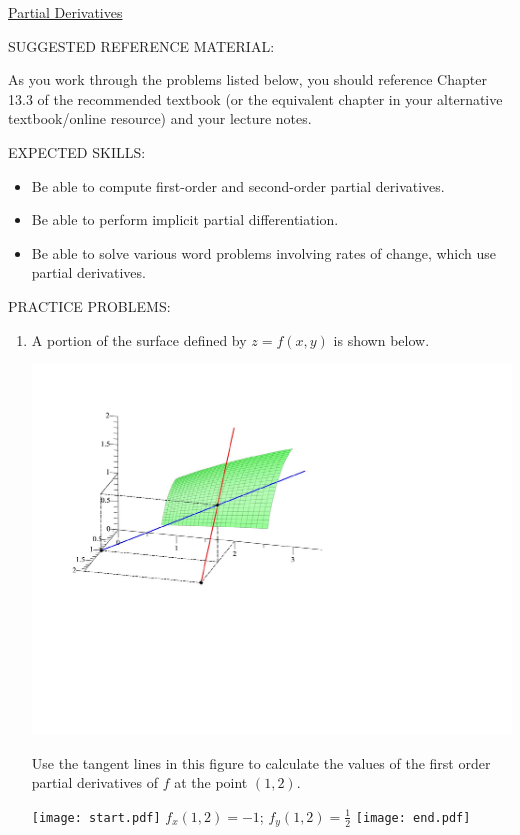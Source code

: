 \documentclass[12pt]{article}
\begin{document}
\begin{center}
\underline{\LARGE{Partial Derivatives}}
\end{center}

\noindent SUGGESTED REFERENCE MATERIAL:

\bigskip

\noindent As you work through the problems listed below, you should reference Chapter 13.3 of the recommended textbook (or the equivalent chapter in your alternative textbook/online resource) and your lecture notes.

\bigskip

\noindent EXPECTED SKILLS:

\begin{itemize}

\item Be able to compute first-order and second-order partial derivatives. 

\item Be able to perform implicit partial differentiation. 

\item Be able to solve various word problems involving rates of change, which use partial derivatives.

\end{itemize}

\noindent PRACTICE PROBLEMS:

\medskip

\begin{enumerate}

\item A portion of the surface defined by $z=f(x,y)$ is shown below.

\begin{center}
\includegraphics[scale=0.6]{tangents2.pdf}
\end{center}

Use the tangent lines in this figure to calculate the values of the first order partial derivatives of $f$ at the point $(1,2)$.

\texttt{[image: start.pdf]}
{{$f_x(1,2)=-1$; $f_y(1,2)=\frac{1}{2}$}}
\texttt{[image: end.pdf]}


\end{enumerate}
\end{document}
